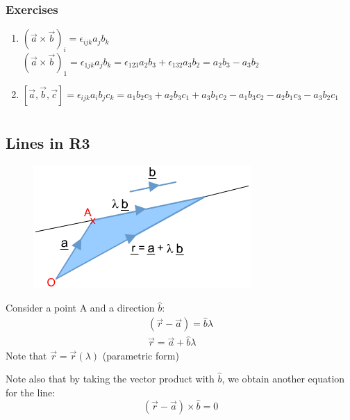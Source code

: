 \documentclass[a4paper, 11pt, normalem]{report}
\begin{document}
\subsection{Exercises}
\begin{enumerate}
    \item $(\vec{a} \times \vec{b})_i = \epsilon_{ijk}a_{j}b_{k}$ \\
          $(\vec{a} \times \vec{b})_1 = \epsilon_{1jk}a_{j}b_{k} = \epsilon_{123}a_{2}b_{3} + \epsilon_{132}a_{3}b_{2} = a_{2}b_{3} - a_{3}b_{2}$
    \item $[\vec{a},\vec{b},\vec{c}] = \epsilon_{ijk}a_{i}b_{j}c_{k} =  a_{1}b_{2}c_{3} + a_{2}b_{3}c_{1} + a_{3}b_{1}c_{2} - a_{1}b_{3}c_{2} - a_{2}b_{1}c_{3} - a_{3}b_{2}c_{1}$
\end{enumerate}

\chapter{}
\section{Lines in R3}
\begin{figure}
    \begin{center}
        \includegraphics[scale=0.5]{EqLine.png}
    \end{center}
\end{figure}
Consider a point A and a direction $\hat{b}$:
\begin{gather*}
    (\vec{r} - \vec{a}) = \hat{b}\lambda \\
    \vec{r} = \vec{a} + \hat{b}\lambda
\end{gather*}
Note that $\vec{r} =\vec{r}(\lambda)$ (parametric form)

Note also that by taking the vector product with $\hat{b}$, we obtain another equation for the line:
\begin{equation*}
    (\vec{r} - \vec{a}) \times \hat{b} = 0
\end{equation*}
\end{document}
